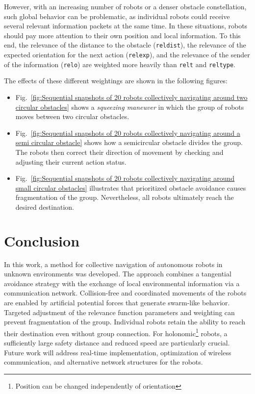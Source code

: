 \documentclass[conference]{IEEEtran}
\begin{document}
However, with an increasing number of robots or a denser obstacle constellation, 
such global behavior can be problematic, as individual 
robots could receive several relevant information packets at the same time. 
In these situations, robots should pay more attention to their own position and local 
information. To this end, the relevance of the distance to the obstacle 
(\texttt{reldist}), the relevance of the expected orientation for the next action 
(\texttt{relexp}), and the relevance of the sender of the information (\texttt{relo}) 
are weighted more heavily than \texttt{relt} and \texttt{reltype}.

The effects of these different weightings are shown in the following figures:
\begin{itemize}
\item Fig.~\ref{fig:Sequential snapshots of 20 robots collectively navigating around two 
circular obstacles} 
shows a \textit{squeezing maneuver} in which the 
group of robots moves between two circular obstacles.
\item Fig.~\ref{fig:Sequential snapshots of 20 robots collectively navigating around a 
semi circular obstacle} 
shows how a semicircular obstacle 
divides the group. The robots then correct their direction of movement 
by checking and adjusting their current action status.
\item Fig.~\ref{fig:Sequential snapshots of 20 robots collectively navigating around 
small circular obstacles} illustrates that prioritized 
obstacle avoidance causes fragmentation of the group. 
Nevertheless, all robots ultimately reach the desired destination.
\end{itemize}


\section{Conclusion}
In this work, a method for collective navigation of autonomous robots in unknown environments 
was developed. The approach combines a tangential avoidance strategy with the exchange of local 
environmental information via a communication network. Collision-free and coordinated movements 
of the robots are enabled by artificial potential forces that generate swarm-like behavior. 
Targeted adjustment of the relevance function parameters and weighting can prevent fragmentation 
of the group. Individual robots retain the ability to reach their destination even without 
group connection. For holonomic\footnote{Position can be changed independently of orientation} 
robots, a sufficiently large safety distance and reduced speed are particularly crucial. 
Future work will address real-time implementation, optimization of wireless communication, 
and alternative network structures for the robots.
\end{document}
